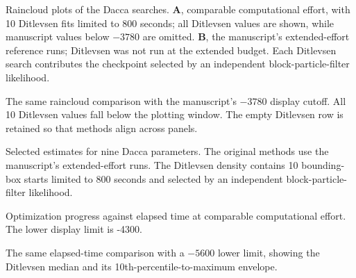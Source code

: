 
\caption{Raincloud plots of the Dacca searches. \textbf{A}, comparable
computational effort, with 10 Ditlevsen fits limited to 800 seconds;
all Ditlevsen values are shown, while manuscript values below
$-3780$ are omitted. \textbf{B}, the
manuscript's extended-effort reference runs; Ditlevsen was not run at the
extended budget. Each Ditlevsen search contributes the checkpoint selected by
an independent block-particle-filter likelihood.}

\caption{The same raincloud comparison with the manuscript's $-3780$ display
cutoff. All 10 Ditlevsen values fall below the plotting window. The empty
Ditlevsen row is retained so that methods align across panels.}

\caption{Selected estimates for nine Dacca parameters. The original methods
use the manuscript's extended-effort runs. The Ditlevsen density contains
10 bounding-box starts limited to 800 seconds and selected by an
independent block-particle-filter likelihood.}

\caption{Optimization progress against elapsed time at comparable
computational effort. The lower display limit is -4300.}

\caption{The same elapsed-time comparison with a $-5600$ lower limit, showing
the Ditlevsen median and its 10th-percentile-to-maximum envelope.}
